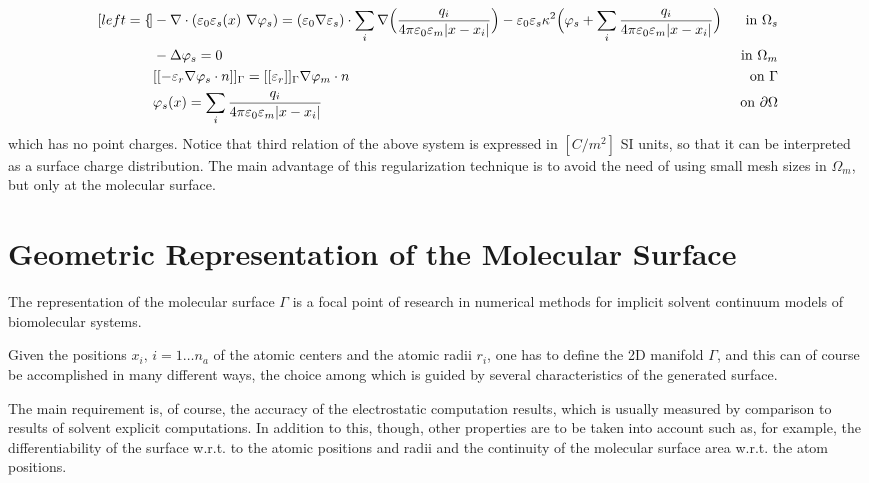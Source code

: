 \documentclass[11pt,a4paper]{article}
\begin{document}
\begin{subequations}
    \label{eq:pbe_no_point_sources}
    \begin{align*}[left=\empheqlbrace]
    & - \nabla\cdot ( \varepsilon_0 \varepsilon_s (x)\ \nabla \varphi_s) = (\varepsilon_0 \nabla \varepsilon_s) \cdot \sum_i \nabla \Big( \frac{q_i}{4 \pi \varepsilon_0 \varepsilon_m |x - x_i|} \Big) - \varepsilon_0 \varepsilon_s \kappa^2 \Big(\varphi_s +  \sum_i \frac{q_i}{4 \pi \varepsilon_0 \varepsilon_m |x - x_i |} \Big) & \mbox{ in } \Omega_s \\
    & - \Delta \varphi_s = 0 & \mbox{ in } \Omega_m  \\
    & [[- \varepsilon_r \nabla \varphi_s \cdot n]]_{\Gamma} = [[ \varepsilon_r]]_{\Gamma} \nabla \varphi_m \cdot n & \mbox{ on } \Gamma  \\
    & \varphi_s (x) = \sum_i \frac{q_i}{4 \pi \varepsilon_0 \varepsilon_m |x - x_i|} & \mbox{ on } \partial \Omega 
    \end{align*}
\end{subequations}
 which has no point charges. Notice that third relation of the above system is expressed in $[C/m^2]$ SI units, so that it can be interpreted as a surface charge distribution. The main advantage of this regularization technique is to avoid the need of using small mesh sizes in $\Omega_m$, but only at the molecular surface.

\section{Geometric Representation of the Molecular Surface}
\label{sec:molecular_surf}

The representation of the molecular surface $\Gamma$ is a focal point of research 
in numerical methods for implicit solvent continuum models of biomolecular systems.

Given the positions $x_i,\, i = 1 \ldots n_a $ of the atomic centers and the
atomic radii $r_i$, one has to define the 2D manifold $\Gamma$, and this can
of course be accomplished in many different ways, the choice among which is
guided by several characteristics of the generated surface.

The main requirement is, of course, the accuracy of the electrostatic computation
results, which is usually measured by comparison to results of solvent explicit
computations. In addition to this, though, other properties are to be taken into 
account such as, for example, the differentiability of the surface w.r.t. to the 
atomic positions and radii and the continuity of the molecular surface area w.r.t.
the atom positions.
\end{document}
